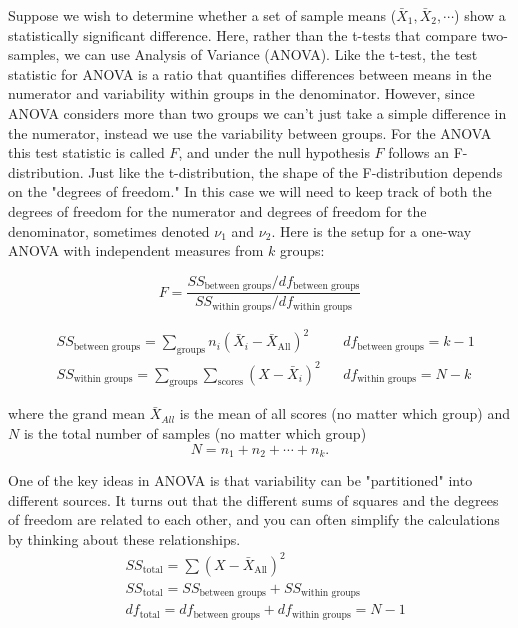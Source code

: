 \documentclass{tufte-handout}
\begin{document}
Suppose we wish to determine whether a set of sample means ($\bar{X}_1,\bar{X}_2,\cdots$) show a statistically significant difference. Here, rather than the t-tests that compare two-samples, we can use Analysis of Variance (ANOVA). Like the t-test, the test statistic for ANOVA is a ratio that quantifies differences between means in the numerator and variability within groups in the denominator. However, since ANOVA considers more than two groups we can't just take a simple difference in the numerator, instead we use the variability between groups. For the ANOVA this test statistic is called $F$, and under the null hypothesis $F$ follows an F-distribution. Just like the t-distribution, the shape of the F-distribution depends on the "degrees of freedom." In this case we will need to keep track of both the degrees of freedom for the numerator and degrees of freedom for the denominator, sometimes denoted $\nu_1$ and $\nu_2$. Here is the setup for a one-way ANOVA with independent measures from $k$ groups:

\begin{equation*}
F = \frac{SS_{\text{between groups}}/df_{\text{between groups}}}{SS_{\text{within groups}}/df_{\text{within groups}}}
\end{equation*}

\begin{align*}
&SS_{\text{between groups}}=\sum_{\text{groups}} n_i(\bar{X}_i-\bar{X}_{\text{All}})^2 & &df_{\text{between groups}}=k-1\\
&SS_{\text{within groups}}     =\sum_{\text{groups}} \sum_{\text{scores}} (X-\bar{X}_i)^2 & &df_{\text{within groups}}=N-k
\end{align*}

where the grand mean $\bar{X}_{All}$  is the mean of all scores (no matter which group) and $N$ is the total number of samples (no matter which group)
\begin{equation*}
N=n_1+n_2+\cdots+n_k.
\end{equation*}

One of the key ideas in ANOVA is that variability can be "partitioned" into different sources. It turns out that the different sums of squares and the degrees of freedom are related to each other, and you can often simplify the calculations by thinking about these relationships.
\begin{align*}
&SS_{\text{total}}=\sum (X-\bar{X}_{\text{All}})^2\\
&SS_{\text{total}}=SS_{\text{between groups}} + SS_{\text{within groups}}\\
&df_{\text{total}}=df_{\text{between groups}} + df_{\text{within groups}}=N-1
\end{align*}
\end{document}
